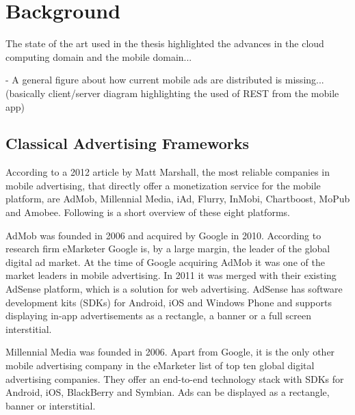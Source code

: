 
\chapter{Background} %


The state of the art used in the thesis highlighted the advances in the cloud computing domain and the mobile domain...


\ifpdf
    \graphicspath{{X/figures/PNG/}{X/figures/PDF/}{X/figures/}}
\else
    \graphicspath{{X/figures/EPS/}{X/figures/}}
\fi


- A general figure about how current mobile ads are distributed is missing... (basically client/server diagram highlighting the used of REST from the mobile app)

\section{Classical Advertising Frameworks}

According to a 2012 article by Matt Marshall, the most reliable companies in mobile advertising, that directly offer a monetization service for the mobile platform, are AdMob, Millennial Media, iAd, Flurry, InMobi, Chartboost, MoPub and Amobee. \cite{mmarshall-top10} Following is a short overview of these eight platforms.

AdMob was founded in 2006 and acquired by Google in 2010. \cite{crunchbase-admob} According to research firm eMarketer Google is, by a large margin, the leader of the global digital ad market. \cite{emarketer-google} At the time of Google acquiring AdMob it was one of the market leaders in mobile advertising. \cite{google-admob} In 2011 it was merged with their existing AdSense platform, which is a solution for web advertising. \cite{admob-adsense} AdSense has software development kits (SDKs) for Android, iOS and Windows Phone \cite{admob-sdk}  and supports displaying in-app advertisements as a rectangle, a banner \cite{admob-banner} or a full screen interstitial.\cite{admob-interstitial}

Millennial Media was founded in 2006. \cite{crunchbase-millenial} Apart from Google, it is the only other mobile advertising company in the eMarketer list of top ten global digital advertising companies. \cite{emarketer-google} They offer an end-to-end technology stack with SDKs for Android, iOS, BlackBerry and Symbian. \cite{millenial-sdk} Ads can be displayed as a rectangle, banner or interstitial. \cite{millenial-android}

